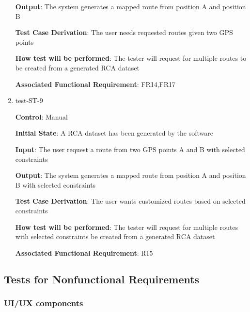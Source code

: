 \documentclass[12pt, titlepage]{article}
\begin{document}
\begin{enumerate}
\textbf{Output}: The system generates a mapped route from position A and position B 

\textbf{Test Case Derivation}: The user needs requested routes given two GPS points

\textbf{How test will be performed}: The tester will request for multiple routes to be created from a generated RCA dataset

\textbf{Associated Functional Requirement}: FR14,FR17

\item{test-ST-9\\}

\textbf{Control}: Manual
					
\textbf{Initial State}: A RCA dataset has been generated by the software
					
\textbf{Input}: The user request a route from two GPS points A and B with selected constraints 
					
\textbf{Output}: The system generates a mapped route from position A and position B with selected constraints

\textbf{Test Case Derivation}: The user wants customized routes based on selected constraints 

\textbf{How test will be performed}: The tester will request for multiple routes with selected constraints be created from a generated RCA dataset

\textbf{Associated Functional Requirement}: R15

\end{enumerate}



\subsection{Tests for Nonfunctional Requirements}

\subsubsection{UI/UX components}
\end{document}
